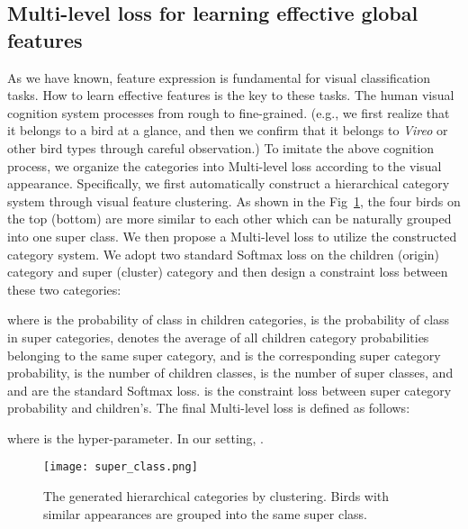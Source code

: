 \documentclass[10pt,twocolumn,letterpaper]{article}
\begin{document}
\subsection{Multi-level loss for learning effective global features}





As we have known, feature expression is fundamental for visual classification tasks. How to learn effective features is the key to these tasks. 
The human visual cognition system processes from rough to fine-grained. (e.g., we first realize that it belongs to a bird at a glance, and then we confirm that it belongs to \textit{Vireo} or other bird types through careful observation.) 
To imitate the above cognition process, we organize the categories into Multi-level loss according to the visual appearance.
Specifically, we first automatically construct a hierarchical category system through visual feature clustering. As shown in the Fig~\ref{superclass}, the four birds on the top (bottom) are more similar to each other which can be naturally grouped into one super class. We then propose a Multi-level loss to utilize the constructed category system. We adopt two standard Softmax loss on the children (origin) category and super (cluster) category and then design a constraint loss between these two categories:

where  is the probability of class  in children categories,  is the probability of class  in super categories,  denotes the average of all children category probabilities belonging to the same super category, and  is the corresponding super category probability,  is the number of children classes,  is the number of super classes, and  and  are the standard Softmax loss.  is the constraint loss between super category probability and children's. 
The final Multi-level loss is defined as follows:

where  is the hyper-parameter. In our setting, .

\begin{figure}[t]
\begin{center}
\texttt{[image: super\_class.png]}
\end{center}
   \caption{The generated hierarchical categories by clustering. Birds with similar appearances are grouped into the same super class. }
\label{superclass}
\end{figure}
\end{document}
